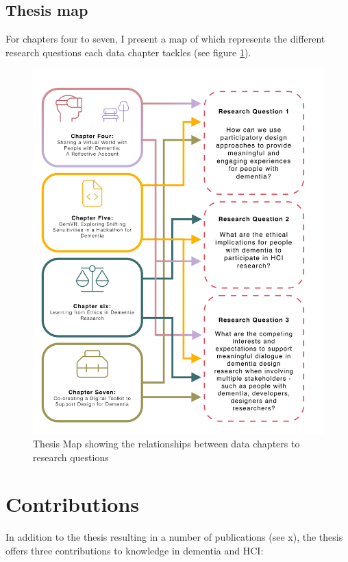 \subsection{Thesis map}
For chapters four to seven, I present a map of which represents the different research questions each data chapter tackles (see figure \ref{fig:RQ_and_Chapters}).

\label{Intro:Thesis Map}
\begin{figure}[htp]
\centering
\includegraphics[width=.8\linewidth]{Images/Thesis_Narrative/RQ_and_Chapters.png}
\caption{Thesis Map showing the relationships between data chapters to research questions}
\label{fig:RQ_and_Chapters}
\end{figure}


\section{Contributions}
\label{Intro:Contribution}
In addition to the thesis resulting in a number of publications (see x), the thesis offers three contributions to knowledge in dementia and HCI:

